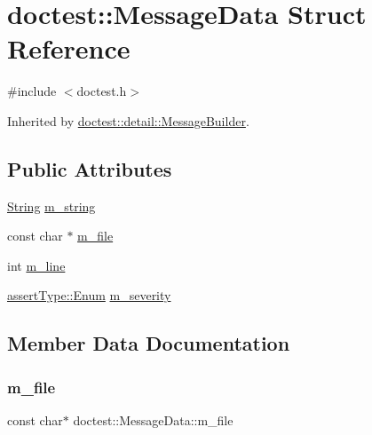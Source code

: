 \hypertarget{structdoctest_1_1_message_data}{}\section{doctest\+:\+:Message\+Data Struct Reference}
\label{structdoctest_1_1_message_data}


{\ttfamily \#include $<$doctest.\+h$>$}



Inherited by \mbox{\hyperlink{structdoctest_1_1detail_1_1_message_builder}{doctest\+::detail\+::\+Message\+Builder}}.

\subsection*{Public Attributes}
\begin{DoxyCompactItemize}
\item 
\mbox{\hyperlink{classdoctest_1_1_string}{String}} \mbox{\hyperlink{structdoctest_1_1_message_data_a0ef5cfd7a399ee475d6357b6dcddfe53}{m\+\_\+string}}
\item 
const char $\ast$ \mbox{\hyperlink{structdoctest_1_1_message_data_acd1e6a5c4f03ed6e098cdab5956a3e17}{m\+\_\+file}}
\item 
int \mbox{\hyperlink{structdoctest_1_1_message_data_a7c1cf03250a68db5befbba63b3824d93}{m\+\_\+line}}
\item 
\mbox{\hyperlink{namespacedoctest_1_1assert_type_ae1bb5bed722f34f1c38b83cb19d326d3}{assert\+Type\+::\+Enum}} \mbox{\hyperlink{structdoctest_1_1_message_data_a24e0a3f475609ce8e02cecc4cb0d3b48}{m\+\_\+severity}}
\end{DoxyCompactItemize}


\subsection{Member Data Documentation}
\mbox{\label{structdoctest_1_1_message_data_acd1e6a5c4f03ed6e098cdab5956a3e17}} 
\subsubsection{\texorpdfstring{m\+\_\+file}{m\_file}}
{\footnotesize\ttfamily const char$\ast$ doctest\+::\+Message\+Data\+::m\+\_\+file}

